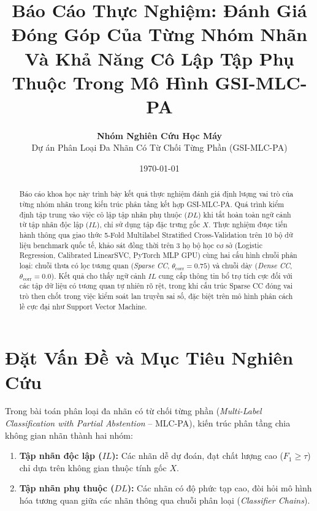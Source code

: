 \documentclass[11pt,a4paper]{article}
\begin{document}
\title{\textbf{\Large Báo Cáo Thực Nghiệm: Đánh Giá Đóng Góp Của Từng Nhóm Nhãn\\ Và Khả Năng Cô Lập Tập Phụ Thuộc Trong Mô Hình GSI-MLC-PA}}
\author{\textbf{Nhóm Nghiên Cứu Học Máy} \\ Dự án Phân Loại Đa Nhãn Có Từ Chối Từng Phần (GSI-MLC-PA)}
\date{\today}
\maketitle

\begin{abstract}
Báo cáo khoa học này trình bày kết quả thực nghiệm đánh giá định lượng vai trò của từng nhóm nhãn trong kiến trúc phân tầng kết hợp GSI-MLC-PA. Quá trình kiểm định tập trung vào việc cô lập tập nhãn phụ thuộc ($DL$) khi tắt hoàn toàn ngữ cảnh từ tập nhãn độc lập ($IL$), chỉ sử dụng tập đặc trưng gốc $X$. Thực nghiệm được tiến hành thông qua giao thức 5-Fold Multilabel Stratified Cross-Validation trên 10 bộ dữ liệu benchmark quốc tế, khảo sát đồng thời trên 3 họ bộ học cơ sở (Logistic Regression, Calibrated LinearSVC, PyTorch MLP GPU) cùng hai cấu hình chuỗi phân loại: chuỗi thưa có lọc tương quan (\textit{Sparse CC}, $\theta_{\text{corr}} = 0.75$) và chuỗi dày (\textit{Dense CC}, $\theta_{\text{corr}} = 0.0$). Kết quả cho thấy ngữ cảnh $IL$ cung cấp thông tin bổ trợ tích cực đối với các tập dữ liệu có tương quan tự nhiên rõ rệt, trong khi cấu trúc Sparse CC đóng vai trò then chốt trong việc kiểm soát lan truyền sai số, đặc biệt trên mô hình phân cách lề cực đại như Support Vector Machine.
\end{abstract}

\section{Đặt Vấn Đề và Mục Tiêu Nghiên Cứu}
Trong bài toán phân loại đa nhãn có từ chối từng phần (\textit{Multi-Label Classification with Partial Abstention} -- MLC-PA), kiến trúc phân tầng chia không gian nhãn thành hai nhóm:
\begin{enumerate}[leftmargin=*]
  \item \textbf{Tập nhãn độc lập ($IL$):} Các nhãn dễ dự đoán, đạt chất lượng cao ($F_1 \ge \tau$) chỉ dựa trên không gian thuộc tính gốc $X$.
  \item \textbf{Tập nhãn phụ thuộc ($DL$):} Các nhãn có độ phức tạp cao, đòi hỏi mô hình hóa tương quan giữa các nhãn thông qua chuỗi phân loại (\textit{Classifier Chains}).
\end{enumerate}
\end{document}
